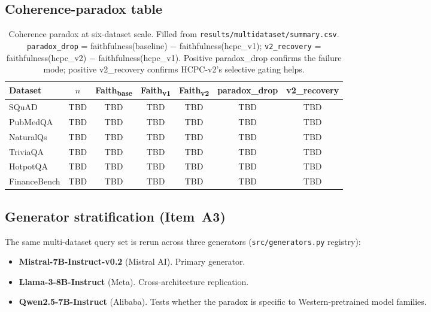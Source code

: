 \subsection{Coherence-paradox table}

\begin{table}[!htbp]
\centering
\caption{Coherence paradox at six-dataset scale. Filled from
\texttt{results/multidataset/summary.csv}. \texttt{paradox\_drop} =
faithfulness(baseline) $-$ faithfulness(hcpc\_v1); \texttt{v2\_recovery}
= faithfulness(hcpc\_v2) $-$ faithfulness(hcpc\_v1). Positive paradox\_drop
confirms the failure mode; positive v2\_recovery confirms HCPC-v2's
selective gating helps.}
\label{tab:multidataset}
\small
\begin{tabular}{lcccccc}
\toprule
Dataset & $n$ & Faith\textsubscript{base} & Faith\textsubscript{v1} &
        Faith\textsubscript{v2} & paradox\_drop & v2\_recovery \\
\midrule
SQuAD          & TBD & TBD & TBD & TBD & TBD & TBD \\
PubMedQA       & TBD & TBD & TBD & TBD & TBD & TBD \\
NaturalQs      & TBD & TBD & TBD & TBD & TBD & TBD \\
TriviaQA       & TBD & TBD & TBD & TBD & TBD & TBD \\
HotpotQA       & TBD & TBD & TBD & TBD & TBD & TBD \\
FinanceBench   & TBD & TBD & TBD & TBD & TBD & TBD \\
\bottomrule
\end{tabular}
\end{table}

\subsection{Generator stratification (Item~A3)}

The same multi-dataset query set is rerun across three generators
(\texttt{src/generators.py} registry):

\begin{itemize}
  \item \textbf{Mistral-7B-Instruct-v0.2} (Mistral AI). Primary generator.
  \item \textbf{Llama-3-8B-Instruct} (Meta). Cross-architecture replication.
  \item \textbf{Qwen2.5-7B-Instruct} (Alibaba). Tests whether the paradox
        is specific to Western-pretrained model families.
\end{itemize}


